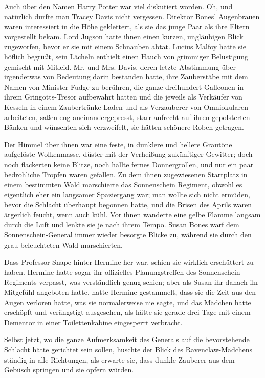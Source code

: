 Auch über den Namen Harry Potter war viel diskutiert worden. Oh, und natürlich
durfte man Tracey Davis nicht vergessen. Direktor Bones' Augenbrauen waren
interessiert in die Höhe geklettert, als sie das junge Paar als ihre Eltern
vorgestellt bekam. Lord Jugson hatte ihnen einen kurzen, ungläubigen Blick
zugeworfen, bevor er sie mit einem Schnauben abtat. Lucius Malfoy hatte sie
höflich begrüßt, sein Lächeln enthielt einen Hauch von grimmiger Belustigung
gemischt mit Mitleid. Mr. und Mrs. Davis, deren letzte Abstimmung über
irgendetwas von Bedeutung darin bestanden hatte, ihre Zauberstäbe mit dem Namen
von Minister Fudge zu berühren, die ganze dreihundert Galleonen in ihrem
Gringotts-Tresor aufbewahrt hatten und die jeweils als Verkäufer von Kesseln in
einem Zaubertränke-Laden und als Verzauberer von Omniokularen arbeiteten, saßen
eng aneinandergepresst, starr aufrecht auf ihren gepolsterten Bänken und
wünschten sich verzweifelt, sie hätten schönere Roben getragen.

Der Himmel über ihnen war eine feste, in dunklere und hellere Grautöne
aufgelöste Wolkenmasse, düster mit der Verheißung zukünftiger Gewitter; doch
noch flackerten keine Blitze, noch hallte fernes Donnergrollen, und nur ein paar
bedrohliche Tropfen waren gefallen. Zu dem ihnen zugewiesenen Startplatz in
einem bestimmten Wald marschierte das Sonnenschein Regiment, obwohl es
eigentlich eher ein langsamer Spaziergang war; man wollte sich nicht ermüden,
bevor die Schlacht überhaupt begonnen hatte, und die Brisen des Aprils waren
ärgerlich feucht, wenn auch kühl. Vor ihnen wanderte eine gelbe Flamme langsam
durch die Luft und lenkte sie je nach ihrem Tempo. Susan Bones warf dem
Sonnenschein-General immer wieder besorgte Blicke zu, während sie durch den grau
beleuchteten Wald marschierten.

Dass Professor Snape hinter Hermine her war, schien sie wirklich erschüttert zu
haben. Hermine hatte sogar ihr offizielles Planungstreffen des Sonnenschein
Regiments verpasst, was verständlich genug schien; aber als Susan ihr danach ihr
Mitgefühl angeboten hatte, hatte Hermine gestammelt, dass sie die Zeit aus den
Augen verloren hatte, was sie normalerweise nie sagte, und das Mädchen hatte
erschöpft und verängstigt ausgesehen, als hätte sie gerade drei Tage mit einem
Dementor in einer Toilettenkabine eingesperrt verbracht.

Selbst jetzt, wo die ganze Aufmerksamkeit des Generals auf die bevorstehende
Schlacht hätte gerichtet sein sollen, huschte der Blick des Ravenclaw-Mädchens
ständig in alle Richtungen, als erwarte sie, dass dunkle Zauberer aus dem
Gebüsch springen und sie opfern würden.


